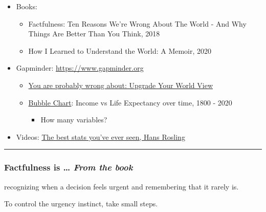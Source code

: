 \documentclass[
]{article}
\providecommand{\tightlist}{%
  \setlength{\itemsep}{0pt}\setlength{\parskip}{0pt}}
\begin{document}
\begin{itemize}
\tightlist
\item
  Books:

  \begin{itemize}
  \tightlist
  \item
    Factfulness: Ten Reasons We're Wrong About The World - And Why
    Things Are Better Than You Think, 2018
  \item
    How I Learned to Understand the World: A Memoir, 2020
  \end{itemize}
\item
  Gapminder: \url{https://www.gapminder.org}

  \begin{itemize}
  \tightlist
  \item
    \href{https://upgrader.gapminder.org}{You are probably wrong about:
    Upgrade Your World View}
  \item
    \href{https://www.gapminder.org/tools/\#$state$time$value=2020;;\&chart-type=bubbles}{Bubble
    Chart}: Income vs Life Expectancy over time, 1800 - 2020

    \begin{itemize}
    \tightlist
    \item
      How many variables?
    \end{itemize}
  \end{itemize}
\item
  Videos:
  \href{http://www.edtech.events/the-best-stats-youve-ever-seen-hans-rosling/}{The
  best stats you've ever seen, Hans Rosling}
\end{itemize}

\begin{center}\rule{0.5\linewidth}{0.5pt}\end{center}

\hypertarget{factfulness-is-from-the-book}{%
\subsubsection{\texorpdfstring{Factfulness is \ldots{} \hfill \emph{From
the
book}}{Factfulness is \ldots{} From the book}}\label{factfulness-is-from-the-book}}

recognizing when a decision feels urgent and remembering that it rarely
is.

To control the urgency instinct, take small steps.
\end{document}
